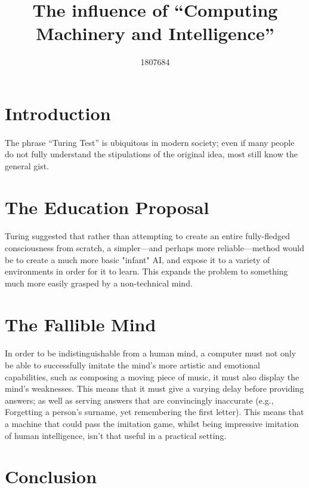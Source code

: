 \documentclass{scrartcl}
\title{The influence of “Computing Machinery and Intelligence”}
\author{1807684}
\begin{document}
\maketitle

\section{Introduction}
\paragraph{}
The phrase “Turing Test” is ubiquitous in modern society; even if many people do not fully understand the stipulations of the original idea, most still know the general gist.

\section{The Education Proposal}
\paragraph{}  %
Turing suggested\cite{Main} that rather than attempting to create an entire fully-fledged consciousness from scratch, a simpler—and perhaps more reliable—method would be to create a much more basic "infant" AI, and expose it to a variety of environments in order for it to learn. This expands the problem to something much more easily grasped by a non-technical mind.\cite{Infants}


\section{The Fallible Mind}
\paragraph{}
In order to be indistinguishable from a human mind, a computer must not  only be able to successfully imitate the mind's more artistic and emotional capabilities, such as composing a moving piece of music, it must also display the mind's weaknesses\cite{AIProgress}. This means that it must give a varying delay before providing answers; as 
well as serving answers that are convincingly inaccurate (e.g., Forgetting a person's surname, yet remembering the first letter). This means that a machine that could pass the imitation game, whilst being impressive imitation of human intelligence, isn't that useful in a practical setting\cite{Counterpoint}.

\section{Conclusion}
\paragraph{}




\end{document}
